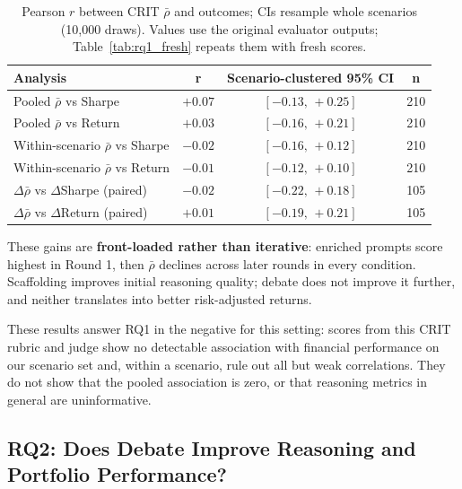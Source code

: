 \documentclass{article}
\begin{document}
\begin{table}[H]
\centering
\small
\begin{tabular}{lccc}
\toprule
\textbf{Analysis} & \textbf{r} & \textbf{Scenario-clustered 95\% CI} & \textbf{n} \\ \midrule
Pooled $\bar{\rho}$ vs Sharpe & $+0.07$ & $[-0.13,\,+0.25]$ & 210 \\
Pooled $\bar{\rho}$ vs Return & $+0.03$ & $[-0.16,\,+0.21]$ & 210 \\
Within-scenario $\bar{\rho}$ vs Sharpe & $-0.02$ & $[-0.16,\,+0.12]$ & 210 \\
Within-scenario $\bar{\rho}$ vs Return & $-0.01$ & $[-0.12,\,+0.10]$ & 210 \\
$\Delta\bar{\rho}$ vs $\Delta$Sharpe (paired) & $-0.02$ & $[-0.22,\,+0.18]$ & 105 \\
$\Delta\bar{\rho}$ vs $\Delta$Return (paired) & $+0.01$ & $[-0.19,\,+0.21]$ & 105 \\
\bottomrule
\end{tabular}
\vspace{4pt}
\caption{Pearson $r$ between CRIT $\bar{\rho}$ and outcomes; CIs resample whole scenarios (10{,}000 draws). Values use the original evaluator outputs; Table~\ref{tab:rq1_fresh} repeats them with fresh scores.}
\label{tab:correlation_reasoning}
\vspace{-1em}
\end{table}


These gains are \textbf{front-loaded rather than iterative}: enriched prompts score highest in Round 1, then $\bar{\rho}$ declines across later rounds in every condition. Scaffolding improves initial reasoning quality; debate does not improve it further, and neither translates into better risk-adjusted returns.




These results answer RQ1 in the negative for this setting: scores from this CRIT rubric and judge show no detectable association with financial performance on our scenario set and, within a scenario, rule out all but weak correlations. They do not show that the pooled association is zero, or that reasoning metrics in general are uninformative.
\vspace{-0.2cm}
\subsection{RQ2: Does Debate Improve Reasoning and Portfolio Performance?}
\vspace{-0.2cm}
\end{document}
